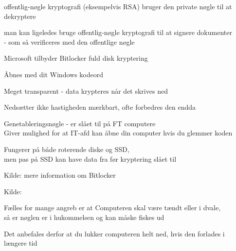 \documentclass[20pt,landscape,a4paper,footrule]{foils}
\begin{document}


\begin{list1}
\item offentlig-nøgle kryptografi (eksempelvis RSA) bruger den private
  nøgle til at dekryptere
\item man kan ligeledes bruge offentlig-nøgle kryptografi til at
  signere dokumenter\\ - som så verificeres med den offentlige nøgle
\end{list1}



\begin{list2}
\item Microsoft tilbyder Bitlocker fuld disk kryptering
\item Åbnes med dit Windows kodeord
\item Meget transparent - data krypteres når det skrives ned
\item Nedsætter ikke hastigheden mærkbart, ofte forbedres den endda
\item Genetableringsnøgle - er slået til på FT computere\\
Giver mulighed for at IT-afd kan åbne din computer hvis du glemmer koden
\item Fungerer på både roterende diske og SSD, \\
men pas på SSD kan have data fra før kryptering slået til
\end{list2}

Kilde: mere information om Bitlocker\\
{\footnotesize {}}



Kilde: {\small
{}}



\begin{list1}
\item Fælles for mange angreb er at Computeren skal være tændt eller i dvale,\\
så er nøglen er i hukommelsen og kan måske fiskes ud
\item Det anbefales derfor at du lukker computeren helt ned, hvis den forlades
i længere tid
\end{list1}
\end{document}
